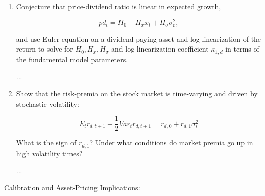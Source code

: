 \documentclass{article}
\begin{document}
\begin{enumerate}
...

\item Conjecture that price-dividend ratio is linear in expected growth, 

$$
pd_t = H_0 + H_x x_t + H_\sigma \sigma_t^2,
$$

and use Euler equation on a dividend-paying asset and log-linearization of the return to solve for $H_0, H_x, H_\sigma$ and log-linearization coefficient $\kappa_{1,d}$ in terms of the fundamental model parameters.

...

\item Show that the risk-premia on the stock market is time-varying and driven by stochastic volatility:

$$
E_t r_{d,t+1} + \frac{1}{2} Var_t r_{d,t+1} = r_{d,0} + r_{d,1} \sigma_t^2
$$

What is the sign of $r_{d,1}$? Under what conditions do market premia go up in high volatility times?

...

\end{enumerate}

Calibration and Asset-Pricing Implications:
\end{document}
